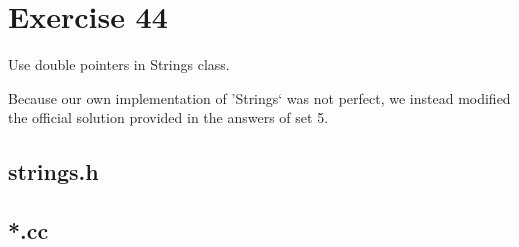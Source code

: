 \section{Exercise 44}
\begin{question}
    Use double pointers in Strings class.
\end{question}

\begin{solution}
    Because our own implementation of 'Strings` was not perfect, we instead modified the official solution provided in the answers of set 5. 

    \subsection{strings.h}
    \vspace{20pt}
    \subsection{*.cc}
\end{solution}


